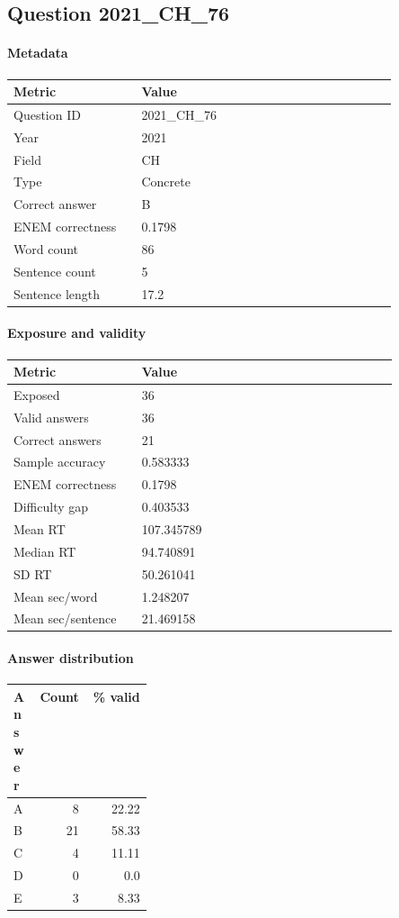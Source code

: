 \subsection*{Question 2021\_CH\_76}
\label{sec:q_2021_CH_76}
\paragraph{Metadata}
\begin{tabular}{p{0.30\linewidth}p{0.60\linewidth}}
\toprule
Metric & Value\\
\midrule
Question ID & 2021\_CH\_76\\
Year & 2021\\
Field & CH\\
Type & Concrete\\
Correct answer & B\\
ENEM correctness & 0.1798\\
Word count & 86\\
Sentence count & 5\\
Sentence length & 17.2\\
\bottomrule
\end{tabular}

\paragraph{Exposure and validity}
\begin{tabular}{p{0.30\linewidth}p{0.60\linewidth}}
\toprule
Metric & Value\\
\midrule
Exposed & 36\\
Valid answers & 36\\
Correct answers & 21\\
Sample accuracy & 0.583333\\
ENEM correctness & 0.1798\\
Difficulty gap & 0.403533\\
Mean RT & 107.345789\\
Median RT & 94.740891\\
SD RT & 50.261041\\
Mean sec/word & 1.248207\\
Mean sec/sentence & 21.469158\\
\bottomrule
\end{tabular}

\paragraph{Answer distribution}
\begin{tabular}{p{0.18\linewidth}rr}
\toprule
Answer & Count & \% valid\\
\midrule
A & 8 & 22.22\\
B & 21 & 58.33\\
C & 4 & 11.11\\
D & 0 & 0.0\\
E & 3 & 8.33\\
\bottomrule
\end{tabular}

